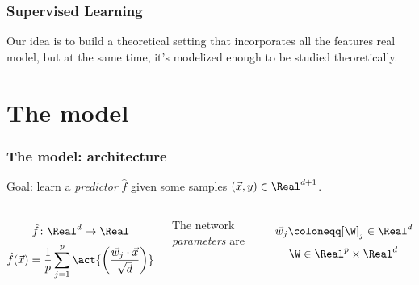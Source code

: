 \documentclass[handout]{beamer}
\begin{document}
\hspace*{-1.2cm}
\begin{frame}[plain]
\titlepage %
\end{frame}

\begin{frame}
  \frametitle{Supervised Learning}
  Our idea is to build a theoretical setting that incorporates all the features real model,
  but at the same time, it's modelized enough to be studied theoretically.
\end{frame}

\section{The model}
\begin{frame}
\frametitle{The model: architecture}
Goal: learn a \emph{predictor} \(\hat{f}\) given some samples \((\vec{x},y)\in\Real^{d+1}\).
\vfill
\begin{columns}
    \vspace{1.5pt}

    \begin{tikzpicture}[x=1cm, y=.8cm, >=latex]
      
    \end{tikzpicture}
    \[\hat{f}\colon \Real^d\to\Real\]
    \[\hat{f}{(\vec{x})} = \frac{1}{p}\sum_{j=1}^{p} \act{\left(\frac{\vec{w}_j \cdot \vec{x}}{\sqrt{d}}\right)}\]
    \vspace{30pt}

    \begin{center}The network \emph{parameters} are\end{center} 
    \[\vec{w}_j \coloneqq [\W]_j \in \Real^d\]
    \[\W \in \Real^p\times\Real^d\]
\end{columns}
\end{frame}
\end{document}
